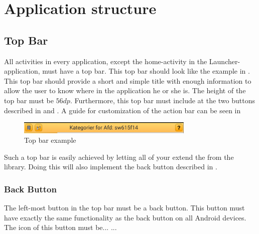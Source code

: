 
\chapter{Application structure}

\section{Top Bar}
All activities in every application, except the home-activity in the Launcher-application,  must have a top bar. This top bar should look like the example in . This top bar should provide a short and simple title with enough information to allow the user to know where in the application he or she is. The height of the top bar must be $56dp$. Furthermore, this top bar must include at the two buttons described in  and . A guide for customization of the action bar can be seen in 


\begin{figure}[!htbp]
    \centering
    \includegraphics[width=0.75\textwidth]{pictures/application_structure/topbar}
    \caption{Top bar example}
    \label{fig:top_bar_example}
\end{figure}


\begin{note}
    Such a top bar is easily achieved by letting all of your  extend the  from the \gc library. Doing this will also implement the back button described in .
\end{note}

\subsection{Back Button}
\label{sec:back_button}
The left-most button in the top bar must be a back button. This button must have exactly the same functionality as the back button on all Android devices. The icon of this button must be... ...

